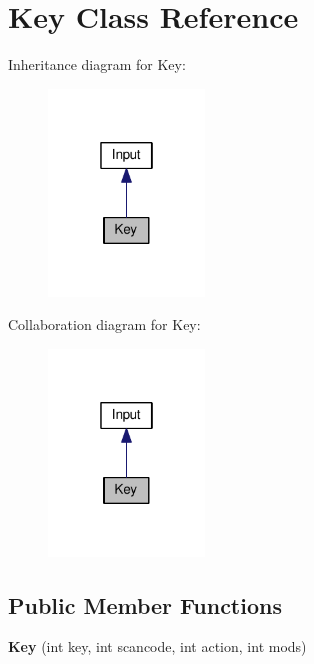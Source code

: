 \hypertarget{classKey}{}\section{Key Class Reference}
\label{classKey}


Inheritance diagram for Key\+:\nopagebreak
\begin{figure}[H]
\begin{center}
\leavevmode
\includegraphics[width=118pt]{classKey__inherit__graph}
\end{center}
\end{figure}


Collaboration diagram for Key\+:\nopagebreak
\begin{figure}[H]
\begin{center}
\leavevmode
\includegraphics[width=118pt]{classKey__coll__graph}
\end{center}
\end{figure}
\subsection*{Public Member Functions}
\begin{DoxyCompactItemize}
\item 
\hypertarget{classKey_a21c1c991388635db9b0690de6ff3292a}{}{\bfseries Key} (int key, int scancode, int action, int mods)\label{classKey_a21c1c991388635db9b0690de6ff3292a}

\end{DoxyCompactItemize}
